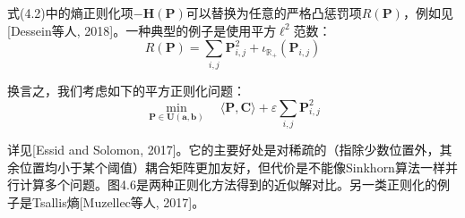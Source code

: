 \documentclass[cn,10pt,math=newtx,citestyle=gb7714-2015,bibstyle=gb7714-2015]{elegantbook}
\begin{document}
\begin{postulate}[其它形式的正则化]
式(4.2)中的熵正则化项$-\mathbf{H(P)}$可以替换为任意的严格凸惩罚项$R(\mathbf{P})$，例如见[Dessein等人, 2018]。一种典型的例子是使用平方$\ell^2$范数：
\begin{equation}
    \label{4.18}
    R(\mathbf{P}) = \sum_{i,j} \mathbf{P}_{i,j}^2 + \iota_{\mathbb{R}_+}(\mathbf{P}_{i,j})
\end{equation}

换言之，我们考虑如下的平方正则化问题：
\begin{equation*}
    \min\limits_{\mathbf{P}\in\mathbf{U(a,b)}} \quad \langle \mathbf{P,C} \rangle + \varepsilon \sum_{i,j} \mathbf{P}_{i,j}^2
\end{equation*}

详见[Essid and Solomon, 2017]。它的主要好处是对稀疏的（指除少数位置外，其余位置均小于某个阈值）耦合矩阵更加友好，但代价是不能像Sinkhorn算法一样并行计算多个问题。图4.6是两种正则化方法得到的近似解对比。另一类正则化的例子是Tsallis熵[Muzellec等人, 2017]。
\end{postulate}
\end{document}
